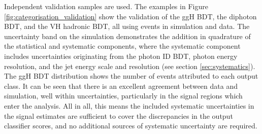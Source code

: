 Independent validation samples are used. The examples in Figure \ref{fig:categorisation_validation} show the validation of the ggH BDT, the diphoton BDT, and the VH hadronic BDT, all using \Zee events in simulation and data. The uncertainty band on the simulation demonstrates the addition in quadrature of the statistical and systematic components, where the systematic component includes uncertainties originating from the photon ID BDT, photon energy resolution, and the jet energy scale and resolution (see section \ref{sec:systematics}). The ggH BDT distribution shows the number of events attributed to each output class. It can be seen that there is an excellent agreement between data and simulation, well within uncertainties, particularly in the signal regions which enter the analysis. All in all, this means the included systematic uncertainties in the signal estimates are sufficient to cover the discrepancies in the output classifier scores, and no additional sources of systematic uncertainty are required.

